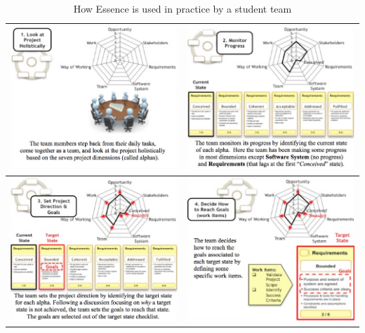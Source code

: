 \begin{table}[t]
\caption{How Essence is used in practice by a student team}
\centering
\begin{tabular}{l|l}
\includegraphics[width=3.2in]{reflection_meeting_images/EssenceMeetingStep1.png} & 
\includegraphics[width=3.2in]{reflection_meeting_images/EssenceMeetingStep2.png} \\
\hline
\includegraphics[width=3.2in]{reflection_meeting_images/EssenceMeetingStep3.png} &
\includegraphics[width=3.2in]{reflection_meeting_images/EssenceMeetingStep4.png} \\

\end{tabular}
\end{table}
